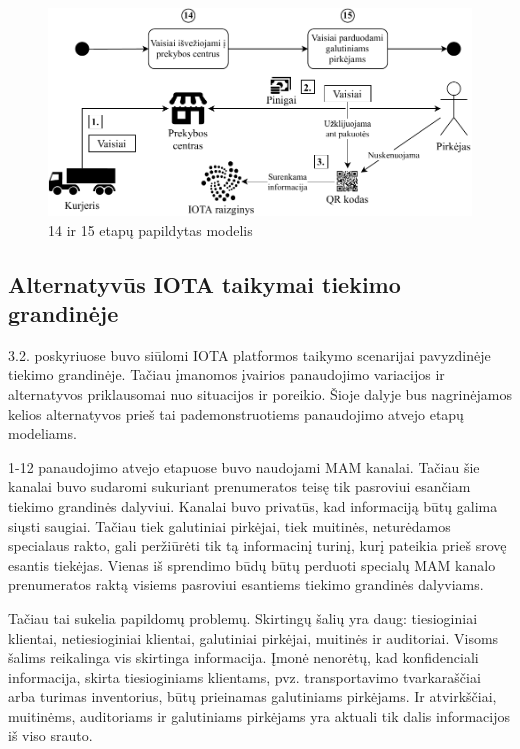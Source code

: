 \begin{figure}[H]
    \centering
    \includegraphics[scale=0.8]{images/iota-usecase-14-15}
    \caption{14 ir 15 etapų papildytas modelis}
\end{figure}




\subsection{Alternatyvūs IOTA taikymai tiekimo grandinėje}

3.2. poskyriuose buvo siūlomi IOTA platformos taikymo scenarijai pavyzdinėje tiekimo grandinėje. Tačiau įmanomos įvairios panaudojimo variacijos ir alternatyvos priklausomai nuo situacijos ir poreikio. Šioje dalyje bus nagrinėjamos kelios alternatyvos prieš tai pademonstruotiems panaudojimo atvejo etapų modeliams.

1-12 panaudojimo atvejo etapuose buvo naudojami MAM kanalai. Tačiau šie kanalai buvo sudaromi sukuriant prenumeratos teisę tik pasroviui esančiam tiekimo grandinės dalyviui. Kanalai buvo privatūs, kad informaciją būtų galima siųsti saugiai. Tačiau tiek galutiniai pirkėjai, tiek muitinės, neturėdamos specialaus rakto, gali peržiūrėti tik tą informacinį turinį, kurį pateikia prieš srovę esantis tiekėjas. Vienas iš sprendimo būdų būtų perduoti specialų MAM kanalo prenumeratos raktą visiems pasroviui esantiems tiekimo grandinės dalyviams.

Tačiau tai sukelia papildomų problemų. Skirtingų šalių yra daug: tiesioginiai klientai, netiesioginiai klientai, galutiniai pirkėjai, muitinės ir auditoriai. Visoms šalims reikalinga vis skirtinga informacija. Įmonė nenorėtų, kad konfidenciali informacija, skirta tiesioginiams klientams, pvz. transportavimo tvarkaraščiai arba turimas inventorius, būtų prieinamas galutiniams pirkėjams. Ir atvirkščiai, muitinėms, auditoriams ir galutiniams pirkėjams yra aktuali tik dalis informacijos iš viso srauto.

